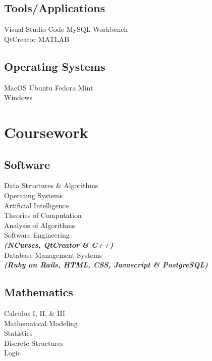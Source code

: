 \documentclass[letterpaper]{deedy-resume} %
\begin{document}
\begin{minipage}[t]{0.35\textwidth}
\subsection{Tools/Applications}
Visual Studio Code \textbullet{} MySQL Workbench \\ QtCreator \textbullet{} MATLAB

\sectionspace
\subsection{Operating Systems}
MacOS \textbullet{} Ubuntu \textbullet{} Fedora \textbullet {} Mint \\ Windows

\sectionspace %


\section{Coursework}



\subsection{Software}

Data Structures \& Algorithms \\
Operating Systems \\
Artificial Intelligence \\
Theories of Computation \\
Analysis of Algorithms \\
Software Engineering \\
{\footnotesize \textit{\textbf{(NCurses, QtCreator \& C++) }}} \\
Database Management Systems \\
{\footnotesize \textit{\textbf{(Ruby on Rails, HTML, CSS, Javascript \& PostgreSQL) }}} \\
 
\sectionspace

\subsection{Mathematics}
Calculus I, II, \& III \\
Mathematical Modeling \\
Statistics \\
Discrete Structures \\
Logic \\


\end{minipage}
\end{document}
